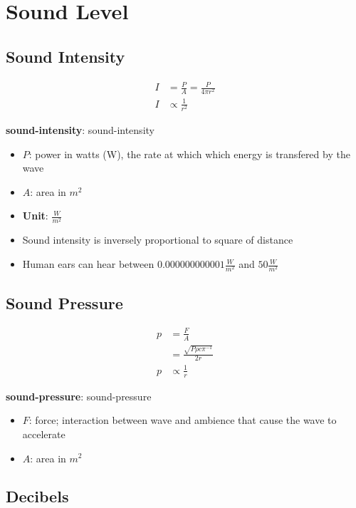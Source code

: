 \chapter{Sound Level}

\section{Sound Intensity}

  \begin{align}
    I &= \frac{P}{A} = \frac{P}{4 \pi r^{2}} \\
    I &\propto \frac{1}{r^{2}}
  \end{align}

  \textbf{\Gls{sound-intensity}}: \glsdesc{sound-intensity}

  \begin{itemize}
    \item $ P $: power in watts (W), the rate at which which energy is
    transfered by the wave
    \item $ A $: area in $ m^{2} $
    \item \textbf{Unit}: $ \frac{W}{m^{2}} $
    \item Sound intensity is inversely proportional to square of distance
    \item Human ears can hear between $ 0.000000000001 \frac{W}{m^{2}} $ and
    $ 50 \frac{W}{m^{2}} $
  \end{itemize}

\section{Sound Pressure}

  \begin{align}
    p &= \frac{F}{A} \\
    &= \frac{\sqrt{P \rho c \pi^{-1}}}{2r} \\
    p &\propto \frac{1}{r}
  \end{align}

  \textbf{\Gls{sound-pressure}}: \glsdesc{sound-pressure}

  \begin{itemize}
    \item $ F $: force; interaction between wave and ambience that cause the
    wave to accelerate
    \item $ A $: area in $ m^{2} $
  \end{itemize}

\section{Decibels}

